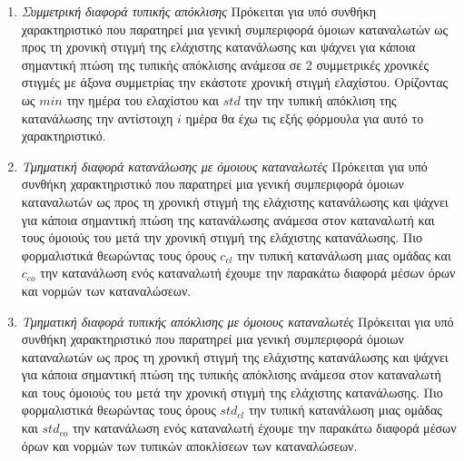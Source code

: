 \begin{enumerate}
\begin{center}
\end{center}
\item{\textit{Συμμετρική διαφορά τυπικής απόκλισης}} Πρόκειται για υπό συνθήκη χαρακτηριστικό που παρατηρεί μια γενική συμπεριφορά όμοιων καταναλωτών ως προς τη χρονική στιγμή της ελάχιστης κατανάλωσης και ψάχνει για κάποια σημαντική πτώση της τυπικής απόκλισης ανάμεσα σε 2 συμμετρικές χρονικές στιγμές με άξονα συμμετρίας την εκάστοτε χρονική στιγμή ελαχίστου. Ορίζοντας ως $min$ την ημέρα του ελαχίστου και $std$ την την τυπική απόκλιση της κατανάλωσης την αντίστοιχη $i$ ημέρα θα έχω τις εξής φόρμουλα για αυτό το χαρακτηριστικό. 
\begin{center}
\end{center}
\item{\textit{Τμηματική διαφορά κατανάλωσης με όμοιους καταναλωτές}} Πρόκειται για υπό συνθήκη χαρακτηριστικό που παρατηρεί μια γενική συμπεριφορά όμοιων καταναλωτών ως προς τη χρονική στιγμή της ελάχιστης κατανάλωσης και ψάχνει για κάποια σημαντική πτώση της κατανάλωσης ανάμεσα στον καταναλωτή και τους όμοιούς του μετά την χρονική στιγμή της ελάχιστης κατανάλωσης. Πιο φορμαλιστικά θεωρώντας τους όρους $c_{cl}$ την τυπική κατανάλωση μιας ομάδας και $c_{co}$ την κατανάλωση ενός καταναλωτή έχουμε την παρακάτω διαφορά μέσων όρων και νορμών των καταναλώσεων.
\begin{center}
\end{center}
\item{\textit{Τμηματική διαφορά τυπικής απόκλισης με όμοιους καταναλωτές}} Πρόκειται για υπό συνθήκη χαρακτηριστικό που παρατηρεί μια γενική συμπεριφορά όμοιων καταναλωτών ως προς τη χρονική στιγμή της ελάχιστης κατανάλωσης και ψάχνει για κάποια σημαντική πτώση της τυπικής απόκλισης ανάμεσα στον καταναλωτή και τους όμοιούς του μετά την χρονική στιγμή της ελάχιστης κατανάλωσης. Πιο φορμαλιστικά θεωρώντας τους όρους $std_{cl}$ την τυπική κατανάλωση μιας ομάδας και $std_{co}$ την κατανάλωση ενός καταναλωτή έχουμε την παρακάτω διαφορά μέσων όρων και νορμών των τυπικών αποκλίσεων των καταναλώσεων.

\end{enumerate}
